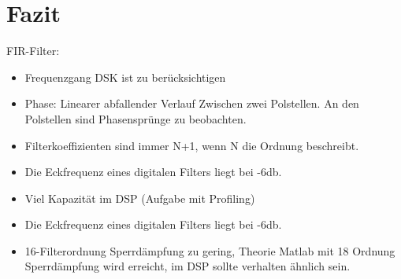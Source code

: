 \section{Fazit}

FIR-Filter:
\begin{itemize}
	\item Frequenzgang DSK ist zu berücksichtigen
\item Phase: Linearer abfallender Verlauf Zwischen zwei Polstellen. An den Polstellen sind Phasensprünge zu beobachten.
\item Filterkoeffizienten sind immer N+1, wenn N die Ordnung beschreibt.
\item Die Eckfrequenz eines digitalen Filters liegt bei -6db.
\item Viel Kapazität im DSP (Aufgabe mit Profiling)
\item Die Eckfrequenz eines digitalen Filters liegt bei -6db. 
\item 16-Filterordnung Sperrdämpfung zu gering, Theorie Matlab mit 18 Ordnung Sperrdämpfung wird erreicht, im DSP sollte verhalten ähnlich sein.
\end{itemize}